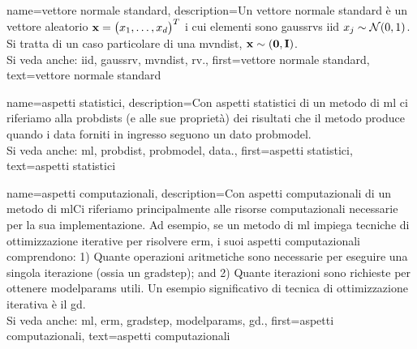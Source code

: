 {name={vettore normale standard}, 
	description={Un vettore normale standard è un vettore aleatorio  ${\bf x}=\big(x_{1},\ldots,x_{d}\big)^{T}$ 
		i cui elementi sono \glspl{gaussrv} \gls{iid} $x_{j} \sim \mathcal{N}(0,1)$. 
		Si tratta di un caso particolare di una \gls{mvndist}, ${\bf x} \sim \mathcal(\mathbf{0},\mathbf{I})$.
		\\ 
		Si veda anche: \gls{iid}, \gls{gaussrv}, \gls{mvndist}, \gls{rv}.}, 
	first={vettore normale standard},
	text={vettore normale standard}
}

{name={aspetti statistici}, 
	description={Con aspetti statistici 
		di un metodo di \gls{ml} ci riferiamo alla \glspl{probdist} (e alle sue proprietà) dei risultati che il metodo 
		produce quando i \gls{data} forniti in ingresso seguono un dato \gls{probmodel}.					
		\\ 
		Si veda anche: \gls{ml}, \gls{probdist}, \gls{probmodel}, \gls{data}.},
	first={aspetti statistici},
	text={aspetti statistici}
}

{name={aspetti computazionali}, 
	description={Con aspetti computazionali di un metodo di \gls{ml}Ci riferiamo principalmente alle 
	risorse computazionali necessarie per la sua implementazione. Ad esempio, se un metodo di \gls{ml} impiega tecniche di 
	ottimizzazione iterative per risolvere \gls{erm}, i suoi aspetti computazionali comprendono: 1) Quante 
	operazioni aritmetiche sono necessarie per eseguire una singola iterazione (ossia un \gls{gradstep}); 
		and 2) Quante iterazioni sono richieste per ottenere \gls{modelparams} utili. Un esempio 
		significativo di tecnica di ottimizzazione iterativa è il \gls{gd}.
					\\ 
		Si veda anche: \gls{ml}, \gls{erm}, \gls{gradstep}, \gls{modelparams}, \gls{gd}.}, 
	first={aspetti computazionali},
	text={aspetti computazionali}
}



